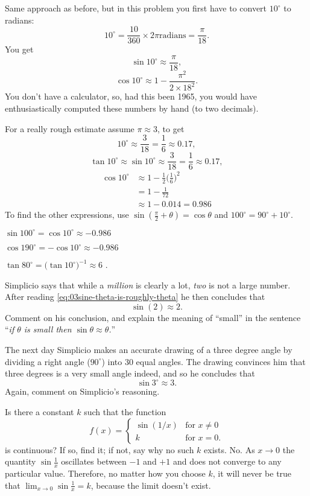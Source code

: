 \begin{multicols}{2}
\setcounter{SUBPROB}{0}
\answer 
Same approach as before, but in this problem you first have to convert
$10^\circ$ to radians:
\[
10^\circ = \frac{10}{360}\times2\pi \textrm{radians} = \frac{\pi}{18}.
\]
You get
\[
\sin 10^\circ \approx \frac{\pi}{18},
\]
\[
\cos 10^\circ \approx 1 - \frac{\pi^2}{2\times18^2}.
\]
You don't have a calculator, so, had this been 1965, you would have
enthusiastically computed these numbers by hand (to two decimals).

For a really rough estimate assume $\pi\approx3$, to get
\[
10^\circ \approx \frac{3}{18} = \frac{1}{6} \approx 0.17,
\]
\[
\tan 10^\circ \approx \sin 10^\circ \approx \frac{3}{18} = \frac{1}{6} \approx
0.17,
\]
\begin{align*}
  \cos 10^\circ &\approx 1 - \frac{1}{2} \bigl(\frac{1}{6}\bigr)^2\\
  &= 1- \frac{1}{72}\\
  &\approx 1-0.014 = 0.986
\end{align*}
To find the other expressions, use $\sin(\frac\pi2+\theta) =
\cos\theta$ and $100^\circ = 90^\circ + 10 ^\circ$.

$\sin 100^\circ = \cos10^\circ \approx -0.986 $

$\cos 190^\circ = -\cos 10^\circ \approx -0.986$

$\tan80^\circ = \bigl(\tan 10^\circ\bigr)^{-1} \approx 6$ .
\endanswer

\problem \subprob Simplicio says that while a \textit{million} is clearly a lot, 
\textit{two} is not a large number.  After reading
\eqref{eq:03sine-theta-is-roughly-theta} he then concludes that
\[
\sin(2) \approx 2.
\]
Comment on his conclusion, and explain the meaning of ``small'' in
the sentence ``\textit{if $\theta$ is small then $\sin\theta \approx
\theta$.}''

\subprob The next day Simplicio makes an accurate drawing of a three
degree angle by dividing a right angle ($90^\circ$) into $30$ equal
angles.  The drawing convinces him that three degrees is a very small
angle indeed, and so he concludes that
\[
\sin 3^\circ \approx 3.
\]
Again, comment on Simplicio's reasoning.

\problem Is there a constant $k$ such that the function 
\[
f(x)= \begin{cases}
  \sin(1/x) &\text{for }x\ne 0\\
  k & \text{for } x=0.
\end{cases}
\]
is continuous?  If so, find it; if not, say why no such $k$ exists.
\answer 
No.  As \(x\to0\) the quantity \(\sin \frac{1}{x}\) oscillates
between \(-1\) and \(+1\) and does not converge to any particular
value.  Therefore, no matter how you choose \(k\), it will never be
true that \(\lim_{x\to 0} \sin \frac1x = k\), because the limit
doesn't exist.
\endanswer


\end{multicols}
